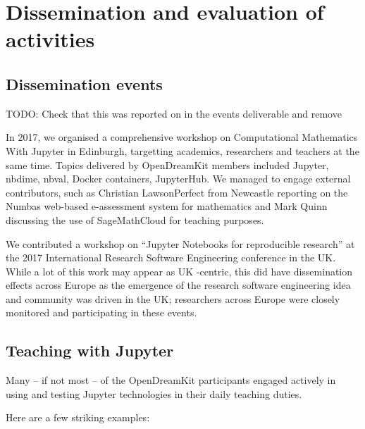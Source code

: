 \documentclass{deliverablereport}
\author{Mike Croucher, Hans Fanghor and Nicolas M. Thiéry}
\begin{document}
\maketitle
\enlargethispage{.5cm}
\githubissuedescription
\clearpage
\tableofcontents


\section{Dissemination and evaluation of activities}

\subsection{Dissemination events}

TODO: Check that this was reported on in the events deliverable and
remove

In 2017, we organised a comprehensive workshop on Computational
Mathematics With Jupyter in Edinburgh, targetting academics, researchers
and teachers at the same time. Topics delivered by OpenDreamKit members
included Jupyter, nbdime, nbval, Docker containers, JupyterHub. We
managed to engage external contributors, such as Christian
Lawson­Perfect from Newcastle reporting on the Numbas web-based
e-assessment system for mathematics and Mark Quinn discussing the use of
SageMathCloud for teaching purposes.

We contributed a workshop on ``Jupyter Notebooks for reproducible
research'' at the 2017 International Research Software Engineering
conference in the UK. While a lot of this work may appear as UK
-centric, this did have dissemination effects across Europe as the
emergence of the research software engineering idea and community was
driven in the UK; researchers across Europe were closely monitored and
participating in these events.

\subsection{Teaching with Jupyter}

Many -- if not most -- of the OpenDreamKit participants engaged actively
in using and testing Jupyter technologies in their daily teaching
duties.

Here are a few striking examples:
\end{document}
